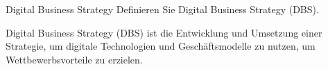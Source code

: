\documentclass{article}
\begin{document}
\begin{exercise}{Digital Business Strategy}
  Definieren Sie Digital Business Strategy (DBS).

  \begin{solution}
    Digital Business Strategy (DBS) ist die Entwicklung und Umsetzung einer Strategie, um digitale Technologien und Geschäftsmodelle zu nutzen, um Wettbewerbsvorteile zu erzielen.
  \end{solution}
\end{exercise}
\end{document}
